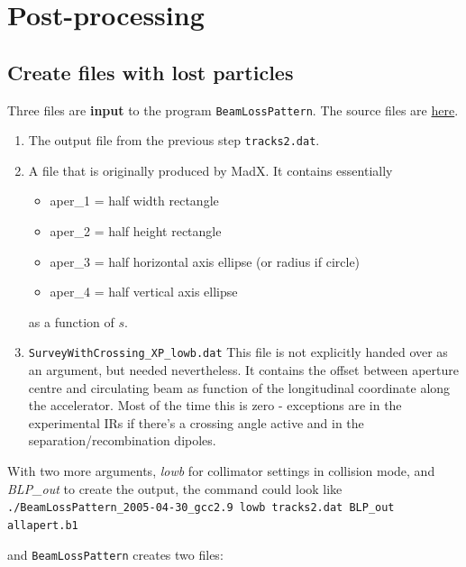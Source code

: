 \documentclass[a4paper, oneside, final]{scrartcl}
\begin{document}
{\section{Post-processing}

\subsection{Create files with lost particles}

Three files are \textbf{input} to the program \texttt{BeamLossPattern}. The source files are {\href{http://lhc-collimation-project.web.cern.ch/lhc-collimation-project/BeamLossPattern.htm}{here}}.

\begin{enumerate}
\item The output file from the previous step \texttt{tracks2.dat}. 
\item A file that is originally produced by MadX. It contains essentially 

\begin{itemize}
\item aper\_1 = half width rectangle
\item aper\_2 = half height rectangle
\item aper\_3 = half horizontal axis ellipse (or radius if circle)
\item aper\_4 = half vertical axis ellipse
\end{itemize}

as a function of $s$. 

\item \texttt{SurveyWithCrossing\_XP\_lowb.dat} This file is not explicitly handed over as an argument, but needed nevertheless. It contains the offset between aperture centre and circulating beam as function of the longitudinal coordinate along the accelerator. Most of the time this is zero - exceptions are in the experimental IRs if there's a crossing angle active and in the separation/recombination dipoles.
\end{enumerate}

With two more arguments, \textit{lowb} for collimator settings in collision mode, and \textit{BLP\_out} to create the output, the command could look like \\

\texttt{./BeamLossPattern\_2005-04-30\_gcc2.9 lowb tracks2.dat BLP\_out allapert.b1}\newline

and \texttt{BeamLossPattern} creates two files:

}
\end{document}
